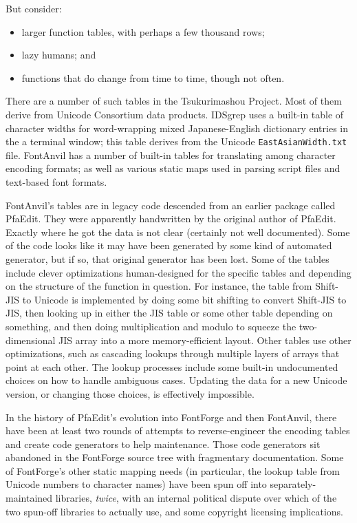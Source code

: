 \documentclass{mitsuba}
\begin{document}
But consider:
\begin{itemize}
  \item larger function tables, with perhaps a few thousand rows;
  \item lazy humans; and
  \item functions that do change from time to time, though not often.
\end{itemize}

There are a number of such tables in the Tsukurimashou Project.  Most of
them derive from Unicode Consortium data products.  IDSgrep uses a built-in
table of character widths for word-wrapping mixed Japanese-English
dictionary entries in the a terminal window; this table derives from the
Unicode \texttt{EastAsianWidth.txt} file.  FontAnvil has a number of
built-in tables for translating among character encoding formats; as well as
various static maps used in parsing script files and text-based font
formats.

FontAnvil's tables are in legacy code descended from an earlier package
called PfaEdit.  They were apparently handwritten by the original author of
PfaEdit.  Exactly where he got the data is not clear (certainly not well
documented).  Some of the code looks like it may have been generated by some
kind of automated generator, but if so, that original generator has been
lost.  Some of the tables include clever optimizations human-designed for
the specific tables and depending on the structure of the function in
question.  For instance, the table from Shift-JIS to Unicode is implemented
by doing some bit shifting to convert Shift-JIS to JIS, then looking up in
either the JIS table or some other table depending on something, and then
doing multiplication and modulo to squeeze the two-dimensional JIS array
into a more memory-efficient layout.  Other tables use other optimizations,
such as cascading lookups through multiple layers of arrays that point at
each other.  The lookup processes include some built-in undocumented choices
on how to handle ambiguous cases.  Updating the data for a new Unicode
version, or changing those choices, is effectively impossible.

In the history of PfaEdit's evolution into FontForge and then FontAnvil,
there have been at least two rounds of attempts to reverse-engineer the
encoding tables and create code generators to help maintenance.  Those code
generators sit abandoned in the FontForge source tree with fragmentary
documentation.  Some of FontForge's other static mapping needs (in
particular, the lookup table from Unicode numbers to character names) have
been spun off into separately-maintained libraries, \emph{twice}, with an
internal political dispute over which of the two spun-off libraries to
actually use, and some copyright licensing implications.
\end{document}
